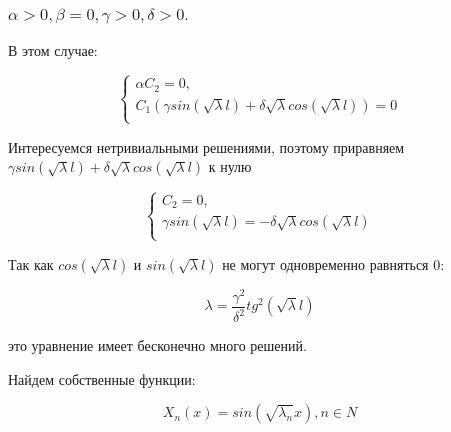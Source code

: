 \documentclass[12pt, a4paper]{report}
\begin{document}
\subsubsection{ $ \alpha > 0, \beta = 0, \gamma > 0, \delta > 0. $}

В этом случае:

\begin{equation*}
 \begin{cases}
\alpha C_2 =0, 
   \\
C_1(\gamma sin(\sqrt{\lambda}l)+\delta \sqrt{\lambda} cos(\sqrt{\lambda}l))=0
   \\  
 \end{cases}
\end{equation*}

Интересуемся нетривиальными решениями, поэтому приравняем $\gamma sin(\sqrt{\lambda}l)+\delta \sqrt{\lambda} cos(\sqrt{\lambda}l)$ к нулю

\begin{equation*}
 \begin{cases}
C_2=0, 
   \\
\gamma sin(\sqrt{\lambda}l)=-\delta \sqrt{\lambda} cos(\sqrt{\lambda}l)
   \\  
 \end{cases}
\end{equation*}

Так как $cos(\sqrt{\lambda}l)$ и $sin(\sqrt{\lambda}l)$ не могут одновременно равняться 0:

\[\lambda = \frac{\gamma^2}{\delta^2} tg^2(\sqrt{\lambda} l)\]

это уравнение имеет бесконечно много решений.

Найдем собственные функции:

\[X_n(x)=sin(\sqrt{\lambda_n}x), n \in N\]
\end{document}
